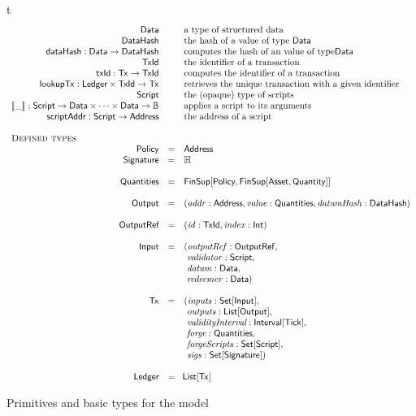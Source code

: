 \begin{ruledfigure}{t}
\begin{displaymath}
\begin{array}{rll}
      \Data && \mbox{a type of structured data}\\
      \DataHash && \mbox{the hash of a value of type \Data{}}\\
      \hashData : \Data \rightarrow \DataHash && \mbox{computes the hash of an value of type\Data}\\
      \TxId && \mbox{the identifier of a transaction}\\
      \txId : \eutxotx \rightarrow \TxId && \mbox{computes the identifier of a transaction}\\
      \lookupTx : \Ledger \times \TxId \rightarrow \eutxotx{} && \mbox{retrieves the unique transaction with a given identifier}\\
      \Script && \mbox{the (opaque) type of scripts}\\
      \applyScript{\_}: \Script \rightarrow \Data \times \cdots \times \Data \rightarrow \B && \mbox{applies a script to its arguments}\\
      \scriptAddr : \Script \rightarrow \Address && \mbox{the address of a script}\\
\\
    \multicolumn{3}{l}{\textsc{Defined types}}\\
    \Policy  &=& \Address\\
    \Signature &=& \H\\
    \\
    \Quantities   &=& \FinSup{\Policy}{\FinSup{\Asset}{\Quantity}}\\
    \\
    \Output &=&(\addr: \Address, \val: \Quantities, \datumHash: \DataHash)\\
    \\
    \OutputRef &= &(\txrefid: \TxId, \idx: \s{Int})\\
    \\
    \Input &=&( \outputref: \sf{OutputRef},\\
                & &\ \validator: \Script,\\
                & &\ \datum: \Data,\\
                & &\ \redeemer: \Data)\\
    \\
    \eutxotx &=&(\inputs: \Set{\Input},\\
               & &\ \outputs: \List{\Output},\\
               & &\ \i{validityInterval}: \Interval{\Tick},\\
               & &\ \forge: \Quantities,\\
               & &\ \forgeScripts: \Set{\Script},\\
               & &\ \sigs: \Set{\Signature})\\
    \\
    \Ledger &=&\!\List{\eutxotx}\\
    \end{array}
  \end{displaymath}
  \caption{Primitives and basic types for the \EUTXOma{} model}
  \label{fig:eutxo-types}
\end{ruledfigure}
